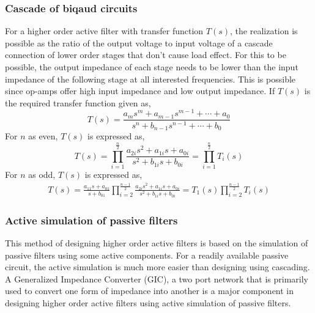 \documentclass{lab_sheet}
\begin{document}
    \subsubsection{Cascade of biqaud circuits}
    For a higher order active filter with transfer function $T(s)$, the realization is possible as the ratio of the output voltage to input voltage of a cascade connection of lower order stages that don't cause load effect. For this to be possible, the output impedance of each stage needs to be lower than the input impedance of the following stage at all interested frequencies. This is possible since op-amps offer high input impedance and low output impedance.
    If $T(s)$ is the required transfer function given as,
    \begin{equation*}
        T(s)=\frac{a_ms^m+a_{m-1}s^{m-1}+\cdots+a_0}{s^n+b_{n-1}s^{n-1}+\cdots+b_0}
    \end{equation*}
    For $n$ as even, $T(s)$ is expressed as,
    \begin{equation*} 
            T(s)=\prod_{i=1}^{\frac{n}{2}}\frac{a_{2i}s^2+a_{1i}s+a_{0i}}{s^2+b_{1i}s+b_{0i}}=\prod_{i=1}^{\frac{n}{2}}T_i(s)
    \end{equation*}
    For $n$ as odd, $T(s)$ is expressed as,
    \begin{equation*} 
      \begin{aligned}
          T(s)=\frac{a_{11}s+a_{01}}{s+b_{01}}\prod_{i=2}^{\frac{n-1}{2}}\frac{a_{2i}s^2+a_{1i}s+a_{0i}}{s^2+b_{1i}s+b_{0i}}=T_1(s)\prod_{i=2}^{\frac{n-1}{2}}T_i(s)
      \end{aligned}
\end{equation*}
    \subsubsection{Active simulation of passive filters}
    This method of designing higher order active filters is based on the simulation of passive filters using some active components. For a readily available passive circuit, the active simulation is much more easier than designing using cascading. A Generalized Impedance Converter (GIC), a two port network that is primarily used to convert one form of impedance into another is a major component in designing higher order active filters using active simulation of passive filters.
\end{document}
